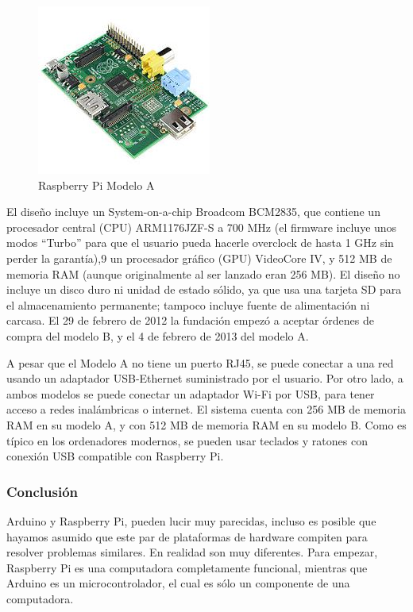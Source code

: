 				\begin{figure}[h]
					\centering
					\includegraphics{imagenes/RBPI.JPG}
					\caption{Raspberry Pi Modelo A}
					\label{contexto:figura}
				\end{figure}
				
				El diseño incluye un System-on-a-chip Broadcom BCM2835, que contiene un procesador central (CPU) ARM1176JZF-S a 700 MHz (el firmware incluye unos modos “Turbo” para que el usuario pueda hacerle overclock de hasta 1 GHz sin perder la garantía),9 un procesador gráfico (GPU) VideoCore IV, y 512 MB de memoria RAM (aunque originalmente al ser lanzado eran 256 MB). El diseño no incluye un disco duro ni unidad de estado sólido, ya que usa una tarjeta SD para el almacenamiento permanente; tampoco incluye fuente de alimentación ni carcasa. El 29 de febrero de 2012 la fundación empezó a aceptar órdenes de compra del modelo B, y el 4 de febrero de 2013 del modelo A.
				
				
				
				A pesar que el Modelo A no tiene un puerto RJ45, se puede conectar a una red usando un adaptador USB-Ethernet suministrado por el usuario. Por otro lado, a ambos modelos se puede conectar un adaptador Wi-Fi por USB, para tener acceso a redes inalámbricas o internet. El sistema cuenta con 256 MB de memoria RAM en su modelo A, y con 512 MB de memoria RAM en su modelo B. Como es típico en los ordenadores modernos, se pueden usar teclados y ratones con conexión USB compatible con Raspberry Pi.
			
			\subsubsection{Conclusión}
		
				Arduino y Raspberry Pi, pueden lucir muy parecidas, incluso es posible que hayamos asumido que este par de plataformas de hardware compiten para resolver problemas similares. En realidad son muy diferentes. Para empezar, Raspberry Pi es una computadora completamente funcional, mientras que Arduino es un microcontrolador, el cual es sólo un componente de una computadora.
				
